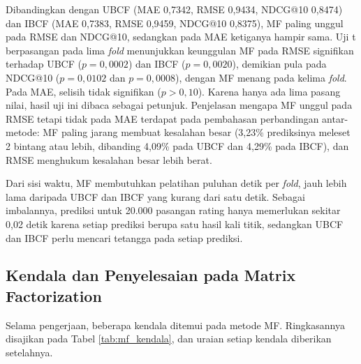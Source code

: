 Dibandingkan dengan UBCF (MAE 0,7342, RMSE 0,9434, NDCG@10 0,8474) dan IBCF (MAE 0,7383, RMSE 0,9459, NDCG@10 0,8375), MF paling unggul pada RMSE dan NDCG@10, sedangkan pada MAE ketiganya hampir sama. Uji t berpasangan pada lima \textit{fold} menunjukkan keunggulan MF pada RMSE signifikan terhadap UBCF ($p = 0{,}0002$) dan IBCF ($p = 0{,}0020$), demikian pula pada NDCG@10 ($p = 0{,}0102$ dan $p = 0{,}0008$), dengan MF menang pada kelima \textit{fold}. Pada MAE, selisih tidak signifikan ($p > 0{,}10$). Karena hanya ada lima pasang nilai, hasil uji ini dibaca sebagai petunjuk. Penjelasan mengapa MF unggul pada RMSE tetapi tidak pada MAE terdapat pada pembahasan perbandingan antar-metode: MF paling jarang membuat kesalahan besar (3,23\% prediksinya meleset 2 bintang atau lebih, dibanding 4,09\% pada UBCF dan 4,29\% pada IBCF), dan RMSE menghukum kesalahan besar lebih berat.

Dari sisi waktu, MF membutuhkan pelatihan puluhan detik per \textit{fold}, jauh lebih lama daripada UBCF dan IBCF yang kurang dari satu detik. Sebagai imbalannya, prediksi untuk 20.000 pasangan rating hanya memerlukan sekitar 0,02 detik karena setiap prediksi berupa satu hasil kali titik, sedangkan UBCF dan IBCF perlu mencari tetangga pada setiap prediksi.

\subsection{Kendala dan Penyelesaian pada Matrix Factorization}
\label{sec:mf_kendala}
Selama pengerjaan, beberapa kendala ditemui pada metode MF. Ringkasannya disajikan pada Tabel \ref{tab:mf_kendala}, dan uraian setiap kendala diberikan setelahnya.

